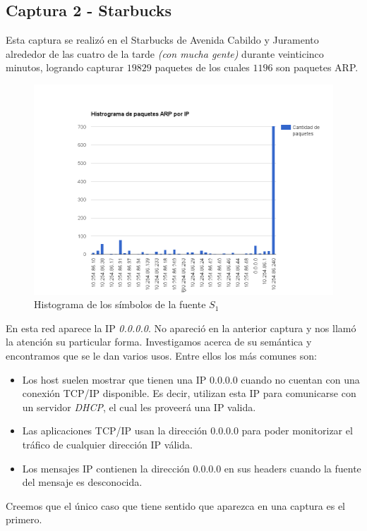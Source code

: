 \subsection{Captura 2 - Starbucks}

Esta captura se realizó en el Starbucks de Avenida Cabildo y Juramento alrededor de las cuatro de la tarde \textit{(con mucha gente)} durante veinticinco minutos, logrando capturar $19829$ paquetes de los cuales $1196$ son paquetes ARP.

\begin{figure}[H]
  \centering
    \includegraphics[width=1.1\textwidth]{imagenes/starbucks/histograma.png}
  \caption{Histograma de los símbolos de la fuente $S_1$}
  \label{fig:ejemplo}
\end{figure}

En esta red aparece la IP \textit{0.0.0.0}. No apareció en la anterior captura y nos llamó la atención su particular forma. Investigamos 
acerca de su semántica y encontramos que se le dan varios usos. Entre ellos los más comunes son:
\begin{itemize}
  \item Los host suelen mostrar que tienen una IP 0.0.0.0 cuando no cuentan con una conexión TCP/IP disponible. Es decir, utilizan esta IP para comunicarse con un servidor \textit{DHCP}, el cual les proveerá una IP valida.
  \item Las aplicaciones TCP/IP usan la dirección 0.0.0.0 para poder monitorizar el tráfico de cualquier dirección IP válida.
  \item Los mensajes IP contienen la dirección 0.0.0.0 en sus headers cuando la fuente del mensaje es desconocida.
\end{itemize}
Creemos que el único caso que tiene sentido que aparezca en una captura es el primero.

